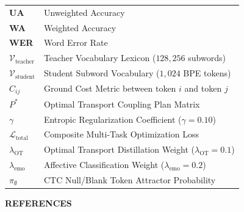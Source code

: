 \documentclass[12pt,a4paper]{report}
\begin{document}
\begin{longtable}{p{2.5cm}p{12cm}}
\textbf{UA} & Unweighted Accuracy \\
\textbf{WA} & Weighted Accuracy \\
\textbf{WER} & Word Error Rate \\
$\mathcal{V}_{\text{teacher}}$ & Teacher Vocabulary Lexicon ($128{,}256$ subwords) \\
$\mathcal{V}_{\text{student}}$ & Student Subword Vocabulary ($1{,}024$ BPE tokens) \\
$C_{ij}$ & Ground Cost Metric between token $i$ and token $j$ \\
$P^*$ & Optimal Transport Coupling Plan Matrix \\
$\gamma$ & Entropic Regularization Coefficient ($\gamma = 0.10$) \\
$\mathcal{L}_{\text{total}}$ & Composite Multi-Task Optimization Loss \\
$\lambda_{\text{OT}}$ & Optimal Transport Distillation Weight ($\lambda_{\text{OT}} = 0.1$) \\
$\lambda_{\text{emo}}$ & Affective Classification Weight ($\lambda_{\text{emo}} = 0.2$) \\
$\pi_\emptyset$ & CTC Null/Blank Token Attractor Probability \\
\end{longtable}

\newpage
{}
\setcounter{page}{1}









\appendix




\newpage
\begin{center}
    {\Large \bfseries REFERENCES \par}
\end{center}
\vspace{1.0cm}
\end{document}
